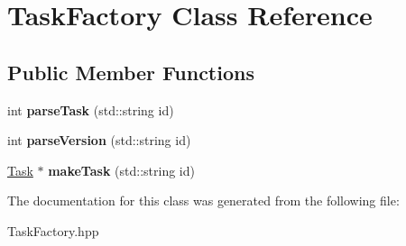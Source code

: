 \hypertarget{classTaskFactory}{\section{\-Task\-Factory \-Class \-Reference}
\label{classTaskFactory}
}
\subsection*{\-Public \-Member \-Functions}
\begin{DoxyCompactItemize}
\item 
\hypertarget{classTaskFactory_a4bac75123ed71a72074160fd06115ce9}{int {\bfseries parse\-Task} (std\-::string id)}\label{classTaskFactory_a4bac75123ed71a72074160fd06115ce9}

\item 
\hypertarget{classTaskFactory_a7f5d78bc38e1622b747eec6ea5a8487d}{int {\bfseries parse\-Version} (std\-::string id)}\label{classTaskFactory_a7f5d78bc38e1622b747eec6ea5a8487d}

\item 
\hypertarget{classTaskFactory_a3ed4adaf33362fb9a9efe4f4f3cb88d6}{\hyperlink{classTask}{\-Task} $\ast$ {\bfseries make\-Task} (std\-::string id)}\label{classTaskFactory_a3ed4adaf33362fb9a9efe4f4f3cb88d6}

\end{DoxyCompactItemize}


\-The documentation for this class was generated from the following file\-:\begin{DoxyCompactItemize}
\item 
\-Task\-Factory.\-hpp\end{DoxyCompactItemize}
